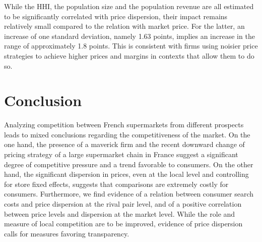 \documentclass[english]{article}
\begin{document}
While the HHI, the population size and the population revenue are all estimated to be significantly correlated with price dispersion, their impact remains relatively small compared to the relation with market price. For the latter, an increase of one standard deviation, namely 1.63 points, implies an increase in the range of approximately 1.8 points. This is consistent with firms using noisier price strategies to achieve higher prices and margins in contexts that allow them to do so.

\section{Conclusion}

Analyzing competition between French supermarkets from different prospects leads to mixed conclusions regarding the competitiveness of the market. On the one hand, the presence of a maverick firm and the recent downward change of pricing strategy of a large supermarket chain in France suggest a significant degree of competitive pressure and a trend favorable to consumers. On the other hand, the significant dispersion in prices, even at the local level and controlling for store fixed effects, suggests that comparisons are extremely costly for consumers. Furthermore, we find evidence of a relation between consumer search costs and price dispersion at the rival pair level, and of a positive correlation between price levels and dispersion at the market level. While the role and measure of local competition are to be improved, evidence of price dispersion calls for measures favoring transparency.

\newpage



\newpage


\end{document}
